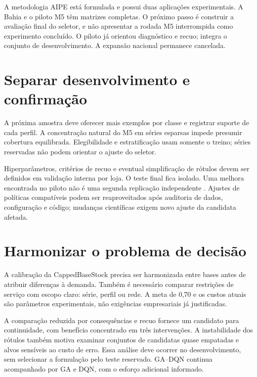 
A metodologia AIPE está formulada e possui duas aplicações experimentais. A Bahia e o piloto M5 têm matrizes completas. O próximo passo é construir a avaliação final do seletor, e não apresentar a rodada M5 interrompida como experimento concluído. O piloto já orientou diagnóstico e recuo; integra o conjunto de desenvolvimento. A expansão nacional permanece cancelada.

\section{Separar desenvolvimento e confirmação}
\label{sec:estudos_caso_adicionais}
A próxima amostra deve oferecer mais exemplos por classe e registrar suporte de cada perfil. A concentração natural do M5 em séries esparsas impede presumir cobertura equilibrada. Elegibilidade e estratificação usam somente o treino; séries reservadas não podem orientar o ajuste do seletor.

Hiperparâmetros, critérios de recuo e eventual simplificação de rótulos devem ser definidos em validação interna por loja. O teste final fica isolado. Uma melhora encontrada no piloto não é uma segunda replicação independente \citep{CawleyTalbot2010}. Ajustes de políticas compatíveis podem ser reaproveitados após auditoria de dados, configuração e código; mudanças científicas exigem novo ajuste da candidata afetada.

\section{Harmonizar o problema de decisão}
A calibração da CappedBaseStock precisa ser harmonizada entre bases antes de atribuir diferenças à demanda. Também é necessário comparar restrições de serviço com escopo claro: série, perfil ou rede. A meta de 0,70 e os custos atuais são parâmetros experimentais, não exigências empresariais já justificadas.

A comparação reduzida por consequências e recuo fornece um candidato para continuidade, com benefício concentrado em três intervenções. A instabilidade dos rótulos também motiva examinar conjuntos de candidatas quase empatadas e alvos sensíveis ao custo de erro. Essa análise deve ocorrer no desenvolvimento, sem selecionar a formulação pelo teste reservado. GA--DQN continua acompanhado por GA e DQN, com o esforço adicional informado.

